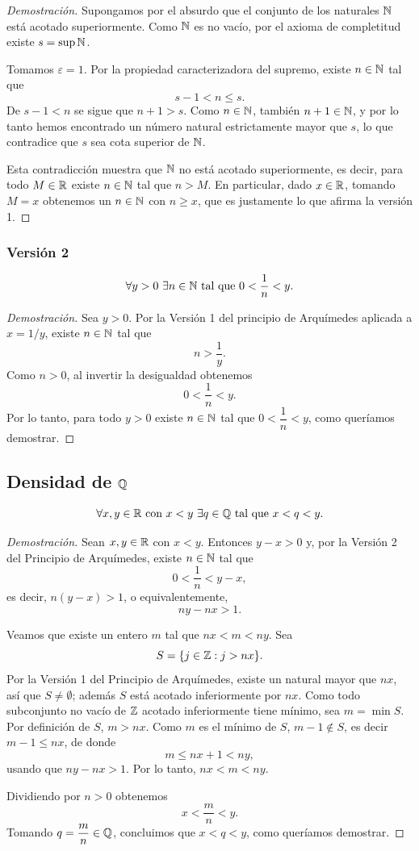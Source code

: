 \begin{proof}[Demostración]
Supongamos por el absurdo que el conjunto de los naturales $\mathbb{N}$ está acotado superiormente.
Como $\mathbb{N}$ es no vacío, por el axioma de completitud existe $s = \sup \mathbb{N}$.

Tomamos $\varepsilon = 1$. Por la propiedad caracterizadora del supremo, existe
$n \in \mathbb{N}$ tal que
\[
s - 1 < n \le s.
\]
De $s - 1 < n$ se sigue que $n + 1 > s$. Como $n \in \mathbb{N}$, también $n+1 \in \mathbb{N}$,
y por lo tanto hemos encontrado un número natural estrictamente mayor que $s$,
lo que contradice que $s$ sea cota superior de $\mathbb{N}$.

Esta contradicción muestra que $\mathbb{N}$ no está acotado superiormente, es decir,
para todo $M \in \mathbb{R}$ existe $n \in \mathbb{N}$ tal que $n > M$. En particular, dado
$x \in \mathbb{R}$, tomando $M = x$ obtenemos un $n \in \mathbb{N}$ con $n \ge x$, que es
justamente lo que afirma la versión 1.
\end{proof}


\subsubsection*{Versión 2}
\[
\forall y > 0 \ \exists n \in \mathbb{N} \text{ tal que } 0 < \frac{1}{n} < y.
\]

\begin{proof}[Demostración]
Sea $y > 0$. Por la Versión 1 del principio de Arquímedes aplicada a $x = 1/y$,
existe $n \in \mathbb{N}$ tal que
\[
n > \frac{1}{y}.
\]
Como $n > 0$, al invertir la desigualdad obtenemos
\[
0 < \frac{1}{n} < y.
\]
Por lo tanto, para todo $y > 0$ existe $n \in \mathbb{N}$ tal que $0 < \dfrac{1}{n} < y$,
como queríamos demostrar.
\end{proof}

\subsection{Densidad de $\mathbb{Q}$}
\[
\forall x, y \in \mathbb{R} \text{ con } x < y \ \exists q \in \mathbb{Q} \text{ tal que } x < q < y.
\]
\begin{proof}[Demostración]
Sean $x, y \in \mathbb{R}$ con $x < y$. Entonces $y - x > 0$ y, por la Versión 2 del
Principio de Arquímedes, existe $n \in \mathbb{N}$ tal que
\[
0 < \frac{1}{n} < y - x,
\]
es decir, $n(y-x) > 1$, o equivalentemente,
\[
ny - nx > 1.
\]

Veamos que existe un entero $m$ tal que $nx < m < ny$. Sea
\[
S = \{ j \in \mathbb{Z} : j > nx \}.
\]
Por la Versión 1 del Principio de Arquímedes, existe un natural mayor que $nx$,
así que $S \neq \emptyset$; además $S$ está acotado inferiormente por $nx$. Como
todo subconjunto no vacío de $\mathbb{Z}$ acotado inferiormente tiene mínimo, sea
$m = \min S$. Por definición de $S$, $m > nx$. Como $m$ es el mínimo de $S$,
$m - 1 \notin S$, es decir $m - 1 \le nx$, de donde
\[
m \le nx + 1 < ny,
\]
usando que $ny - nx > 1$. Por lo tanto, $nx < m < ny$.

Dividiendo por $n > 0$ obtenemos
\[
x < \frac{m}{n} < y.
\]
Tomando $q = \dfrac{m}{n} \in \mathbb{Q}$, concluimos que $x < q < y$, como queríamos
demostrar.
\end{proof}

